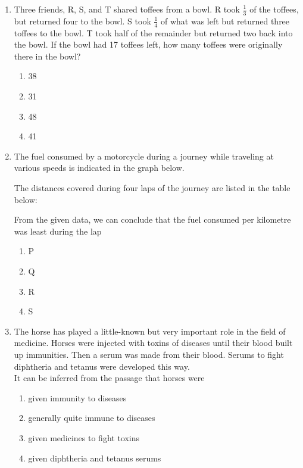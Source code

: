 \documentclass[journal,9pt,onecolumn]{IEEEtran}
\begin{document}
\begin{enumerate}
\item Three friends, R, S, and T shared toffees from a bowl. R took $\frac{1}{3}$ of the toffees, but returned four to the bowl. S took $\frac{1}{4}$ of what was left but returned three toffees to the bowl. T took half of the remainder but returned two back into the bowl. If the bowl had 17 toffees left, how many toffees were originally there in the bowl?
\begin{multicols}{2}
\begin{enumerate}
    \item 38
    \item 31
    \item 48
    \item 41
\end{enumerate}
\end{multicols}

\item The fuel consumed by a motorcycle during a journey while traveling at various speeds is indicated in the graph below.
\begin{center}
    
\end{center}
The distances covered during four laps of the journey are listed in the table below:
\begin{table}[h!]
    \centering
    
    \label{tab:XE-2011}
\end{table}
From the given data, we can conclude that the fuel consumed per kilometre was least during the lap
\begin{multicols}{4}
\begin{enumerate}
    \item P
    \item Q
    \item R
    \item S
\end{enumerate}
\end{multicols}

\item The horse has played a little-known but very important role in the field of medicine. Horses were injected with toxins of diseases until their blood built up immunities. Then a serum was made from their blood. Serums to fight diphtheria and tetanus were developed this way.\\
It can be inferred from the passage that horses were
\begin{multicols}{2}
\begin{enumerate}
    \item given immunity to diseases
    \item generally quite immune to diseases
    \item given medicines to fight toxins
    \item given diphtheria and tetanus serums
\end{enumerate}
\end{multicols}


\end{enumerate}
\end{document}
